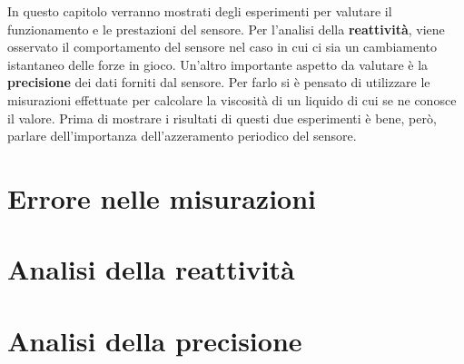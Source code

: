 In questo capitolo verranno mostrati degli esperimenti per valutare il funzionamento e le prestazioni del sensore. 
Per l'analisi della \textbf{reattivit\`{a}}, viene osservato il comportamento del sensore nel caso in cui ci sia 
un cambiamento istantaneo delle forze in gioco. 
Un'altro importante aspetto da valutare \`{e} la \textbf{precisione} dei dati forniti dal sensore. Per farlo 
si \`{e} pensato di utilizzare le misurazioni effettuate per calcolare la viscosit\`{a} di un liquido di cui se ne conosce 
il valore. 
Prima di mostrare i risultati di questi due esperimenti \`{e} bene, per\`{o}, parlare dell'importanza dell'azzeramento periodico 
del sensore.

\section{Errore nelle misurazioni} \label{sec:drifting}


\section{Analisi della reattivit\`{a}}


\section{Analisi della precisione}
